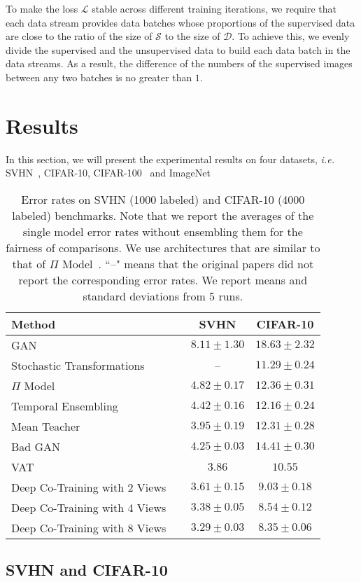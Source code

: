 \documentclass[runningheads]{llncs}
\begin{document}
To make the loss $\mathcal{L}$ stable across different training iterations, we require that each data stream provides data batches whose proportions of the supervised data are close to the ratio of the size of $\mathcal{S}$ to the size of $\mathcal{D}$.
To achieve this, we evenly divide the supervised and the unsupervised data to build each data batch in the data streams.
As a result, the difference of the numbers of the supervised images between any two batches is no greater than $1$.

\section{Results}
In this section, we will present the experimental results on four datasets, \textit{i.e.} SVHN~\cite{svhn}, CIFAR-10, CIFAR-100~\cite{cifar} and ImageNet~\cite{ILSVRC15}\begin{table}
  \setlength{\tabcolsep}{10pt}
  \centering
  \begin{tabular}{lcc}
    \toprule
    Method & SVHN & CIFAR-10 \\
    \midrule
    GAN~\cite{igan} & $8.11\pm1.30$ & $18.63\pm2.32$ \\
    Stochastic Transformations~\cite{stoc_trans} & -- & $11.29\pm0.24$ \\
    $\Pi$ Model~\cite{tessl} & $4.82\pm0.17$ & $12.36\pm0.31$ \\
    Temporal Ensembling~\cite{tessl} & $4.42\pm0.16$ & $12.16\pm0.24$ \\
    Mean Teacher~\cite{mean} & $3.95\pm0.19$ & $12.31\pm0.28$ \\
    Bad GAN~\cite{badgan}  & $4.25\pm0.03$ & $14.41\pm0.30$ \\
    VAT~\cite{vat} & $3.86$ & $10.55$ \\
    \midrule
    Deep Co-Training with 2 Views $~~~~$ & $3.61\pm0.15$ & $9.03\pm0.18$ \\
    Deep Co-Training with 4 Views $~~~~$ & $3.38\pm0.05$ & $8.54\pm0.12$ \\
    Deep Co-Training with 8 Views $~~~~$ & $3.29\pm0.03$ & $8.35\pm0.06$ \\
    \bottomrule
  \end{tabular}
  \vspace{0.05in}
  \caption{Error rates on SVHN (1000 labeled) and CIFAR-10 (4000 labeled) benchmarks.
  Note that we report the averages of the single model error rates without ensembling them for the fairness of comparisons.
  We use architectures that are similar to that of $\Pi$ Model~\cite{tessl}.
  ``--" means that the original papers did not report the corresponding error rates.
  We report means and standard deviations from 5 runs.}
  \label{tab:sc}
\end{table}\subsection{SVHN and CIFAR-10}
\end{document}
